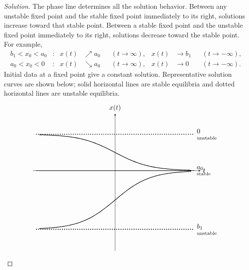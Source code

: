 \documentclass[10pt]{amsart}
\newenvironment{solution}
{\begin{proof}[Solution]}
{\end{proof}}
\begin{document}
\begin{onehalfspace}
\begin{solution}
            The phase line determines all the solution behavior. Between any unstable
            fixed point and the stable fixed point immediately to its right, solutions
            increase toward that stable point. Between a stable fixed point and the
            unstable fixed point immediately to its right, solutions decrease toward
            the stable point. For example,
            \[
                \begin{aligned}
                    b_1<x_0<a_0 &: &x(t)&\nearrow a_0 &&(t\to\infty),
                    &x(t)&\to b_1 &&(t\to-\infty),\\
                    a_0<x_0<0 &: &x(t)&\searrow a_0 &&(t\to\infty),
                    &x(t)&\to0 &&(t\to-\infty).
                \end{aligned}
            \]
            Initial data at a fixed point give a constant solution. Representative
            solution curves are shown below; solid horizontal lines are stable
            equilibria and dotted horizontal lines are unstable equilibria.
            \[
                \begin{tikzpicture}[>=stealth,x=0.82cm,y=0.82cm]
                  \draw[->] (-5.2,0)--(5.4,0) node[right] {$t$};
                  \draw[->] (0,-5.05)--(0,3.6) node[above] {$x(t)$};

                  \draw[very thick,dotted] (-5.0,2.3)--(5.0,2.3)
                  node[right,align=left] {$0$\\[-1mm]{\scriptsize unstable}};
                  \draw[thick] (-5.0,0)--(5.0,0)
                  node[right,align=left] {$a_0$\\[-1mm]{\scriptsize stable}};
                  \draw[very thick,dotted] (-5.0,-3.7)--(5.0,-3.7)
                  node[right,align=left] {$b_1$\\[-1mm]{\scriptsize unstable}};

                  \draw[thick,domain=-4.8:4.8,samples=120,smooth]
                  plot (\x,{2.3/(1+exp(0.9*\x))});
                  \draw[thick,domain=-4.8:4.8,samples=120,smooth]
                  plot (\x,{-3.7/(1+exp(0.9*\x))});


\end{tikzpicture}\]
\end{solution}
\end{onehalfspace}
\end{document}
